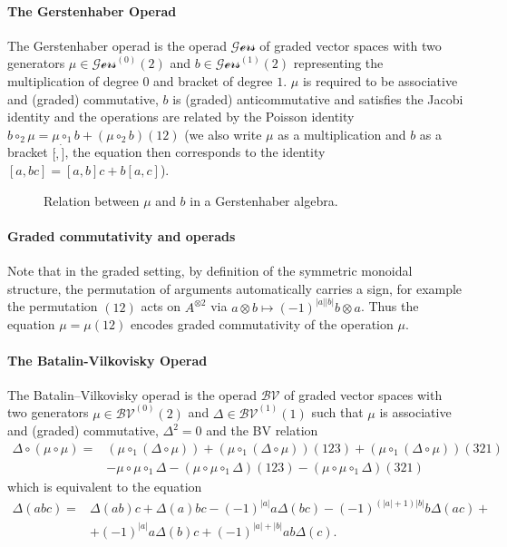 \documentclass{scrartcl}
\theoremstyle{plain}
\theoremstyle{definition}
\newcommand{\comp}{\circ}
\begin{document}
\paragraph{The Gerstenhaber Operad} The Gerstenhaber operad is the operad $\mathcal {Gers}$ of graded vector spaces with two generators $\mu\in\mathcal{Gers}^{(0)}(2)$ and $b\in\mathcal{Gers}^{(1)}(2)$ representing the multiplication of degree $0$ and bracket of degree $1$. $\mu$ is required to be associative and (graded) commutative, $b$ is (graded) anticommutative and satisfies the Jacobi identity and the operations are related by the Poisson identity $b\comp_2 \mu = \mu\comp_1 b + (\mu\comp_2 b)(12)$ (we also write $\mu$ as a multiplication and $b$ as a bracket $[\dot, \dot]$, the equation then corresponds to the identity $[a, bc] = [a,b]c + b[a,c]$).

\begin{figure}[ht]\label{gers_operad_relation}
\centering

\caption{Relation between $\mu$ and $b$ in a Gerstenhaber algebra. }
\end{figure}


\paragraph{Graded commutativity and operads} Note that in the graded setting, by definition of the symmetric monoidal structure, the permutation of arguments automatically carries a sign, for example the permutation $(12)$ acts on $A^{\otimes 2}$ via $a\otimes b\mapsto {(-1)}^{|a||b|}b\otimes a$. Thus the equation $\mu = \mu (12)$ encodes graded commutativity of the operation $\mu$.

\paragraph{The Batalin-Vilkovisky Operad} The Batalin–Vilkovisky operad is the operad $\mathcal {BV}$ of graded vector spaces with two generators $\mu\in\mathcal{BV}^{(0)}(2)$ and $\Delta\in\mathcal{BV}^{(1)}(1)$ such that $\mu$ is associative and (graded) commutative, $\Delta^2=0$ and the BV relation
\begin{align*}
    \Delta \comp (\mu\comp\mu) = &(\mu\comp_1(\Delta\comp\mu)) + (\mu\comp_1(\Delta\comp\mu)) (123) + (\mu\comp_1(\Delta\comp\mu)) (321) \\
    &- \mu \comp \mu \comp_1 \Delta - (\mu \comp \mu \comp_1 \Delta){(123)} - (\mu \comp \mu \comp_1 \Delta){(321)}
\end{align*}
which is equivalent to the equation 
\begin{align*}
    \Delta(abc)=&\Delta(ab)c+\Delta(a)bc-{(-1)}^{|a|}a\Delta(bc)-{(-1)}^{(|a|+1)|b|}b\Delta(ac)+\\&+{(-1)}^{|a|}a\Delta(b)c+{(-1)}^{|a|+|b|}ab\Delta(c).
\end{align*}
\end{document}
